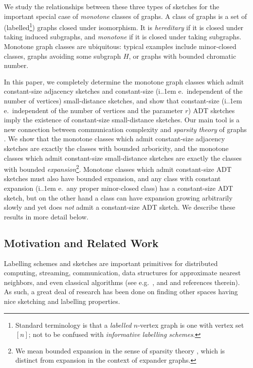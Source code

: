 \documentclass[11pt]{article}
\newcommand*\ie{i.\kern.1em e.\ }
\theoremstyle{definition}
\begin{document}
We study the relationships between these three types of sketches for the important special case of
\emph{monotone} classes of graphs. A class of graphs is a set of (labelled\footnote{Standard
terminology is that a \emph{labelled} $n$-vertex graph is one with vertex set $[n]$; not to be
confused with \emph{informative labelling schemes}.}) graphs closed under isomorphism. It is
\emph{hereditary} if it is closed under taking induced subgraphs, and \emph{monotone} if it is
closed under taking subgraphs. Monotone graph classes are ubiquitous: typical examples include
minor-closed classes, graphs avoiding some subgraph $H$, or graphs with bounded chromatic number.

In this paper, we completely determine the monotone graph classes which admit constant-size
adjacency sketches and constant-size (\ie independent of the number of vertices) small-distance
sketches, and show that constant-size (\ie independent of the number of vertices and the parameter
$r$) ADT sketches imply the existence of constant-size small-distance sketches. Our main tool is a
new connection between communication complexity and \emph{sparsity theory} of graphs \cite{NO12}. We
show that the monotone classes which admit constant-size adjacency sketches are exactly the classes
with bounded arboricity, and the monotone classes which admit constant-size small-distance sketches
are exactly the classes with bounded \emph{expansion}\footnote{We mean bounded expansion in the
sense of sparsity theory \cite{NO12}, which is distinct from expansion in the context of expander
graphs.}.  Monotone classes which admit constant-size ADT sketches must also have bounded expansion,
and any class with constant expansion (\ie any proper minor-closed class) has a constant-size ADT
sketch, but on the other hand a class can have expansion growing arbitrarily slowly and yet does
\emph{not} admit a constant-size ADT sketch. We describe these results in more detail below.

\subsection{Motivation and Related Work}
Labelling schemes and sketches are important primitives for distributed computing, streaming,
communication, data structures for approximate nearest neighbors, and even classical algorithms (see
e.g.~\cite{KNR92,GP03,Spin03,Pel05,EIX22}, and \cite{AMS99,Ind06,AK08,Raz17,AKR18} and references
therein).  As such, a great deal of research has been done on finding other spaces having nice
sketching and labelling properties.
\end{document}
